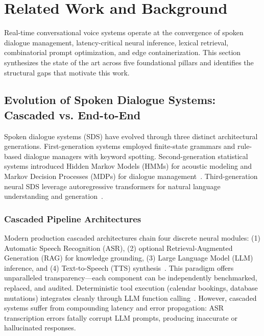 \documentclass[11pt,a4paper]{article}
\begin{document}
\section{Related Work and Background}
\label{sec:related_work}

Real-time conversational voice systems operate at the convergence of spoken dialogue management, latency-critical neural inference, lexical retrieval, combinatorial prompt optimization, and edge containerization. This section synthesizes the state of the art across five foundational pillars and identifies the structural gaps that motivate this work.

\subsection{Evolution of Spoken Dialogue Systems: Cascaded vs. End-to-End}
\label{subsec:rw_sds}

Spoken dialogue systems (SDS) have evolved through three distinct architectural generations. First-generation systems employed finite-state grammars and rule-based dialogue managers with keyword spotting. Second-generation statistical systems introduced Hidden Markov Models (HMMs) for acoustic modeling and Markov Decision Processes (MDPs) for dialogue management~\cite{young2013pomdp}. Third-generation neural SDS leverage autoregressive transformers for natural language understanding and generation~\cite{vaswani2017attention}.

\subsubsection{Cascaded Pipeline Architectures}
Modern production cascaded architectures chain four discrete neural modules: (1) Automatic Speech Recognition (ASR), (2) optional Retrieval-Augmented Generation (RAG) for knowledge grounding, (3) Large Language Model (LLM) inference, and (4) Text-to-Speech (TTS) synthesis~\cite{larson2020turn}. This paradigm offers unparalleled transparency---each component can be independently benchmarked, replaced, and audited. Deterministic tool execution (calendar bookings, database mutations) integrates cleanly through LLM function calling~\cite{schick2023toolformer}. However, cascaded systems suffer from compounding latency and error propagation: ASR transcription errors fatally corrupt LLM prompts, producing inaccurate or hallucinated responses.
\end{document}
